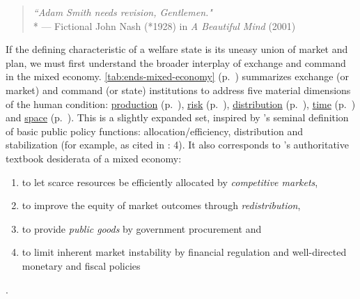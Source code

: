 \begin{quote}
	\emph{``Adam Smith needs revision, Gentlemen."}\\* %
	--- Fictional John Nash (*1928) in \emph{A Beautiful Mind} (2001)
\end{quote}

If the defining characteristic of a welfare state is its uneasy union of market and plan, we must first understand the broader interplay of exchange and command in the mixed economy. 
\autoref{tab:ends-mixed-economy} (p.~\pageref{tab:ends-mixed-economy}) summarizes exchange (or market) and command (or state) institutions to address five material dimensions of the human condition: \hyperref[sec:production]{production} (p.~\pageref{sec:production}), \hyperref[sec:risk]{risk} (p.~\pageref{sec:risk}), \hyperref[sec:distribution]{distribution} (p.~\pageref{sec:distribution}), \hyperref[sec:time]{time} (p.~\pageref{sec:time}) and \hyperref[sec:space]{space} (p.~\pageref{sec:space}). 
This is a slightly expanded set, inspired by \citeauthor{MusgThet1959}'s \citeyearpar{MusgThet1959} seminal definition of basic public policy functions: allocation/efficiency, distribution and stabilization (for example, as cited in \citealt{Bordo2011}: 4). 
It also corresponds to \citeauthor{Samuelson-1954-eu}'s authoritative textbook \citeyearpar[recently][]{Samuelson2005} desiderata of a mixed economy: 
\begin{enumerate}
	\item to let scarce resources be efficiently allocated by \emph{competitive markets},
	\item to improve the equity of market outcomes through \emph{redistribution}, 
	\item to provide \emph{public goods} by government procurement and
	\item to limit inherent market instability by financial regulation and well-directed monetary and fiscal policies
\end{enumerate} \citep[as cited in][K532]{Stiglitz2011}.



